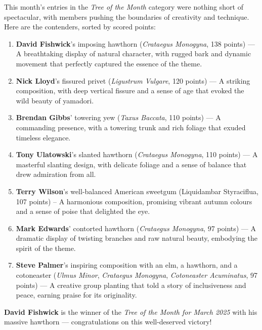 \noindent 
This month's entries in the \textit{Tree of the Month} category were nothing short of spectacular, with members pushing the boundaries of creativity and technique.
Here are the contenders, sorted by scored points:

\begin{enumerate}
    \item \textbf{David Fishwick}'s imposing hawthorn (\textit{Crataegus Monogyna}, 138 points) --- A breathtaking display of natural character, with rugged bark and dynamic movement that perfectly captured the essence of the theme.

    \item \textbf{Nick Lloyd}'s fissured privet (\textit{Ligustrum Vulgare}, 120 points) --- A striking composition, with deep vertical fissure and a sense of age that evoked the wild beauty of yamadori.

    \item \textbf{Brendan Gibbs}' towering yew (\textit{Taxus Baccata}, 110 points) --- A commanding presence, with a towering trunk and rich foliage that exuded timeless elegance.

    \item \textbf{Tony Ulatowski}'s slanted hawthorn (\textit{Crataegus Monogyna}, 110 points) --- A masterful slanting design, with delicate foliage and a sense of balance that drew admiration from all.

    \item \textbf{Terry Wilson}'s well\--balanced American sweetgum (Liquidambar Styraciflua, 107 points) – A harmonious composition, promising vibrant autumn colours and a sense of poise that delighted the eye.    

    \item \textbf{Mark Edwards}' contorted hawthorn (\textit{Crataegus Monogyna}, 97 points) --- A dramatic display of twisting branches and raw natural beauty, embodying the spirit of the theme.

    \item \textbf{Steve Palmer}'s inspiring composition with an elm, a hawthorn, and a cotoneaster (\textit{Ulmus Minor}, \textit{Crataegus Monogyna}, \textit{Cotoneaster Acuminatus}, 97 points) --- A creative group planting that told a story of inclusiveness and peace, earning praise for its originality.
\end{enumerate}

\noindent 
\textbf{David Fishwick} is the winner of the \textit{Tree of the Month for March 2025} with his massive hawthorn --- congratulations on this well\--deserved victory!

